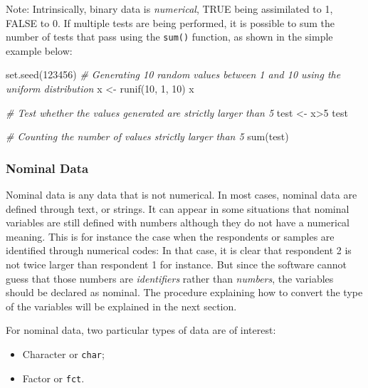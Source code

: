 \documentclass[
]{book}
\newenvironment{Shaded}{\begin{snugshade}}{\end{snugshade}}
\newcommand{\CommentTok}[1]{\textcolor[rgb]{0.56,0.35,0.01}{\textit{#1}}}
\newcommand{\DecValTok}[1]{\textcolor[rgb]{0.00,0.00,0.81}{#1}}
\newcommand{\FunctionTok}[1]{\textcolor[rgb]{0.00,0.00,0.00}{#1}}
\newcommand{\NormalTok}[1]{#1}
\newcommand{\OtherTok}[1]{\textcolor[rgb]{0.56,0.35,0.01}{#1}}
\newcommand{\SpecialCharTok}[1]{\textcolor[rgb]{0.00,0.00,0.00}{#1}}
\providecommand{\tightlist}{%
  \setlength{\itemsep}{0pt}\setlength{\parskip}{0pt}}
\begin{document}
Note: Intrinsically, binary data is \emph{numerical}, TRUE being assimilated to 1, FALSE to 0. If multiple tests are being performed, it is possible to sum the number of tests that pass using the \texttt{sum()} function, as shown in the simple example below:

\begin{Shaded}
\begin{Highlighting}[]
\FunctionTok{set.seed}\NormalTok{(}\DecValTok{123456}\NormalTok{)}
\CommentTok{\# Generating 10 random values between 1 and 10 using the uniform distribution}
\NormalTok{x }\OtherTok{\textless{}{-}} \FunctionTok{runif}\NormalTok{(}\DecValTok{10}\NormalTok{, }\DecValTok{1}\NormalTok{, }\DecValTok{10}\NormalTok{)}
\NormalTok{x}

\CommentTok{\# Test whether the values generated are strictly larger than 5}
\NormalTok{test }\OtherTok{\textless{}{-}}\NormalTok{ x}\SpecialCharTok{\textgreater{}}\DecValTok{5}
\NormalTok{test}

\CommentTok{\# Counting the number of values strictly larger than 5}
\FunctionTok{sum}\NormalTok{(test)}
\end{Highlighting}
\end{Shaded}

\hypertarget{nominal-data}{%
\subsubsection{Nominal Data}\label{nominal-data}}

Nominal data is any data that is not numerical. In most cases, nominal data are defined through text, or strings. It can appear in some situations that nominal variables are still defined with numbers although they do not have a numerical meaning. This is for instance the case when the respondents or samples are identified through numerical codes: In that case, it is clear that respondent 2 is not twice larger than respondent 1 for instance. But since the software cannot guess that those numbers are \emph{identifiers} rather than \emph{numbers}, the variables should be declared as nominal. The procedure explaining how to convert the type of the variables will be explained in the next section.

For nominal data, two particular types of data are of interest:

\begin{itemize}
\tightlist
\item
  Character or \texttt{char};
\item
  Factor or \texttt{fct}.
\end{itemize}
\end{document}
